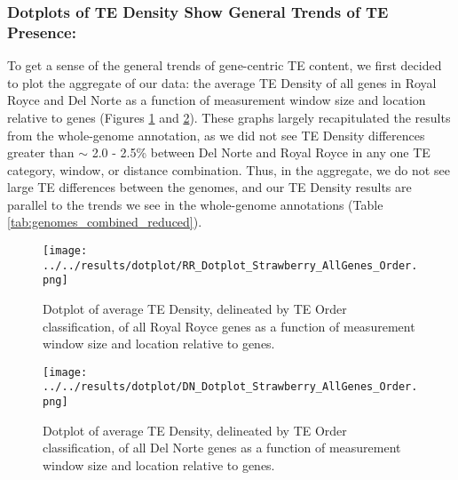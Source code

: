 \documentclass[fleqn,10pt]{olplainarticle}
\begin{document}
\subsubsection{Dotplots of TE Density Show General Trends of TE Presence:}
To get a sense of the general trends of gene-centric TE content, we first decided to plot the aggregate of our data: the average TE Density of all genes in Royal Royce and Del Norte as a function of measurement window size and location relative to genes (Figures \ref{fig:RR_order_dotplot} and \ref{fig:DN_order_dotplot}).
These graphs largely recapitulated the results from the whole-genome annotation, as we did not see TE Density differences greater than $\sim$ 2.0 - 2.5\% between Del Norte and Royal Royce in any one TE category, window, or distance combination.
Thus, in the aggregate, we do not see large TE differences between the genomes, and our TE Density results are parallel to the trends we see in the whole-genome annotations (Table \ref{tab:genomes_combined_reduced}).


\begin{figure}[ht]
\centering
\texttt{[image: ../../results/dotplot/RR\_Dotplot\_Strawberry\_AllGenes\_Order.png]}
\caption{Dotplot of average TE Density, delineated by TE Order classification, of all Royal Royce genes as a function of measurement window size and location relative to genes.}
\label{fig:RR_order_dotplot}
\end{figure}

\begin{figure}[ht]
\centering
\texttt{[image: ../../results/dotplot/DN\_Dotplot\_Strawberry\_AllGenes\_Order.png]}
\caption{Dotplot of average TE Density, delineated by TE Order classification, of all Del Norte genes as a function of measurement window size and location relative to genes.}
\label{fig:DN_order_dotplot}
\end{figure}

\end{document}
